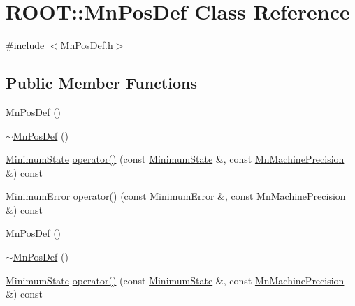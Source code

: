 \hypertarget{classROOT_1_1Minuit2_1_1MnPosDef}{}\section{R\+O\+OT\+:\+:Mn\+Pos\+Def Class Reference}
\label{classROOT_1_1Minuit2_1_1MnPosDef}


{\ttfamily \#include $<$Mn\+Pos\+Def.\+h$>$}

\subsection*{Public Member Functions}
\begin{DoxyCompactItemize}
\item 
\mbox{\hyperlink{classROOT_1_1Minuit2_1_1MnPosDef_a937f62100fca6ac5e8f32c882639be9c}{Mn\+Pos\+Def}} ()
\item 
\mbox{\hyperlink{classROOT_1_1Minuit2_1_1MnPosDef_a1bc55c7ddd347c0f7834b7d64a62b964}{$\sim$\+Mn\+Pos\+Def}} ()
\item 
\mbox{\hyperlink{classROOT_1_1Minuit2_1_1MinimumState}{Minimum\+State}} \mbox{\hyperlink{classROOT_1_1Minuit2_1_1MnPosDef_a5a550c841e9b62d3c09cdf9df61a88f4}{operator()}} (const \mbox{\hyperlink{classROOT_1_1Minuit2_1_1MinimumState}{Minimum\+State}} \&, const \mbox{\hyperlink{classROOT_1_1Minuit2_1_1MnMachinePrecision}{Mn\+Machine\+Precision}} \&) const
\item 
\mbox{\hyperlink{classROOT_1_1Minuit2_1_1MinimumError}{Minimum\+Error}} \mbox{\hyperlink{classROOT_1_1Minuit2_1_1MnPosDef_ace62b61f17edf0c57ef824003b99b9ec}{operator()}} (const \mbox{\hyperlink{classROOT_1_1Minuit2_1_1MinimumError}{Minimum\+Error}} \&, const \mbox{\hyperlink{classROOT_1_1Minuit2_1_1MnMachinePrecision}{Mn\+Machine\+Precision}} \&) const
\item 
\mbox{\hyperlink{classROOT_1_1Minuit2_1_1MnPosDef_a937f62100fca6ac5e8f32c882639be9c}{Mn\+Pos\+Def}} ()
\item 
\mbox{\hyperlink{classROOT_1_1Minuit2_1_1MnPosDef_a1bc55c7ddd347c0f7834b7d64a62b964}{$\sim$\+Mn\+Pos\+Def}} ()
\item 
\mbox{\hyperlink{classROOT_1_1Minuit2_1_1MinimumState}{Minimum\+State}} \mbox{\hyperlink{classROOT_1_1Minuit2_1_1MnPosDef_a5a550c841e9b62d3c09cdf9df61a88f4}{operator()}} (const \mbox{\hyperlink{classROOT_1_1Minuit2_1_1MinimumState}{Minimum\+State}} \&, const \mbox{\hyperlink{classROOT_1_1Minuit2_1_1MnMachinePrecision}{Mn\+Machine\+Precision}} \&) const

\end{DoxyCompactItemize}
